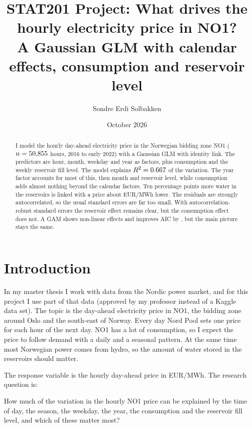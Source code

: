\documentclass[12pt]{article}
\title{STAT201 Project: What drives the hourly electricity price in NO1?\\[0.3em]
\large A Gaussian GLM with calendar effects, consumption and reservoir level}
\author{Sondre Erdi Solbakken}
\date{October 2026}
\newcommand{\eur}{EUR/MWh}
\begin{document}
\maketitle

\begin{abstract}
\noindent
I model the hourly day-ahead electricity price in the Norwegian bidding zone NO1 ($n = 50{,}855$ hours, 2016 to early 2022) with a Gaussian GLM with identity link. The predictors are hour, month, weekday and year as factors, plus consumption and the weekly reservoir fill level. The model explains $R^2 = 0.667$ of the variation. The year factor accounts for most of this, then month and reservoir level, while consumption adds almost nothing beyond the calendar factors. Ten percentage points more water in the reservoirs is linked with a price about \bResTenAbs{} \eur{} lower. The residuals are strongly autocorrelated, so the usual standard errors are far too small. With autocorrelation-robust standard errors the reservoir effect remains clear, but the consumption effect does not. A GAM shows non-linear effects and improves AIC by \dAICGam, but the main picture stays the same.
\end{abstract}

\section{Introduction}

In my master thesis I work with data from the Nordic power market, and for this project I use part of that data (approved by my professor instead of a Kaggle data set). The topic is the day-ahead electricity price in NO1, the bidding zone around Oslo and the south-east of Norway. Every day Nord Pool sets one price for each hour of the next day. NO1 has a lot of consumption, so I expect the price to follow demand with a daily and a seasonal pattern. At the same time most Norwegian power comes from hydro, so the amount of water stored in the reservoirs should matter.

The response variable is the hourly day-ahead price in \eur. The research question is:

\begin{displayquote}
How much of the variation in the hourly NO1 price can be explained by the time of day, the season, the weekday, the year, the consumption and the reservoir fill level, and which of these matter most?
\end{displayquote}
\end{document}
